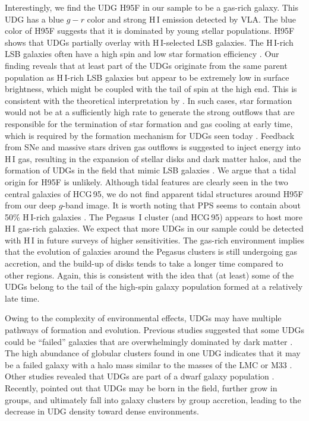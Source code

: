 \documentclass[twocolumn,trackchanges]{aastex61}
\begin{document}
Interestingly, we find the UDG H95F in our sample to be a gas-rich galaxy.  This UDG has a blue $g-r$ color and strong H\,{\small I} emission detected by VLA. The blue color of H95F suggests that it is dominated by young stellar populations. H95F shows that UDGs partially overlay with H\,{\small I}-selected LSB galaxies. The H\,{\small I}-rich LSB galaxies often have a high spin and low star formation efficiency \citep{AmoriscoLoeb2016}. Our finding reveals that at least part of the UDGs originate from the same parent population as H\,{\small I}-rich LSB galaxies but appear to be extremely low in surface brightness, which might be coupled with the tail of spin at the high end. This is consistent with the theoretical interpretation by \citet{AmoriscoLoeb2016}. In such cases, star formation would not be at a sufficiently high rate to generate the strong outflows that are responsible for the termination of star formation and gas cooling at early time, which is required by the formation mechanism for UDGs seen today \citep{Janowiecki2015,Trujillo2017}. Feedback from SNe and massive stars driven gas outflows is suggested to inject energy into H\,{\small I} gas, resulting in the expansion of stellar disks and dark matter halos, and the formation of UDGs in the field that mimic LSB galaxies \citep{Di Cintio2016}. 
We argue that a tidal origin for H95F is unlikely.  Although tidal features are clearly seen in the two central galaxies of HCG\,95,  we do not find apparent tidal structures around H95F from our deep $g$-band image.  It is worth noting that PPS seems to contain about 50\% H\,{\small I}-rich galaxies \citep{Richter1982}.  The Pegasus~I cluster (and HCG\,95) appears to host more  H\,{\small I} gas-rich galaxies.  We expect that more UDGs in our sample could be detected with H\,{\small I} in future surveys of higher sensitivities. The gas-rich environment implies that the evolution of galaxies around the Pegasus clusters is still undergoing gas accretion, and the build-up of disks tends to take a longer time compared to other regions. Again, this is consistent with the idea that (at least) some of the UDGs belong to the tail of the high-spin galaxy population formed at a relatively late time. 


Owing to the complexity of environmental effects, UDGs may have multiple pathways of formation and evolution. Previous studies suggested that some UDGs could be ``failed'' galaxies that are overwhelmingly dominated by dark matter \citep{van Dokkum2015a,van Dokkum2016,van Dokkum2017}. The high abundance of globular clusters found in one UDG indicates that it may be a failed galaxy with a halo mass similar to the masses of the LMC or M33 \citep{BeasleTrujillo2016,Peng2016}. Other studies revealed that UDGs are part of a dwarf galaxy population \citep{Yozin2015,AmoriscoLoeb2016,Amorisco2016,Beasley2016,BeasleTrujillo2016,Di Cintio2016}. Recently, \citet{RomanTrujillo2016} pointed  out that UDGs may be born in the field, further grow in groups, and ultimately fall into galaxy clusters by group accretion, leading to the decrease in UDG density toward dense environments.  
\end{document}
